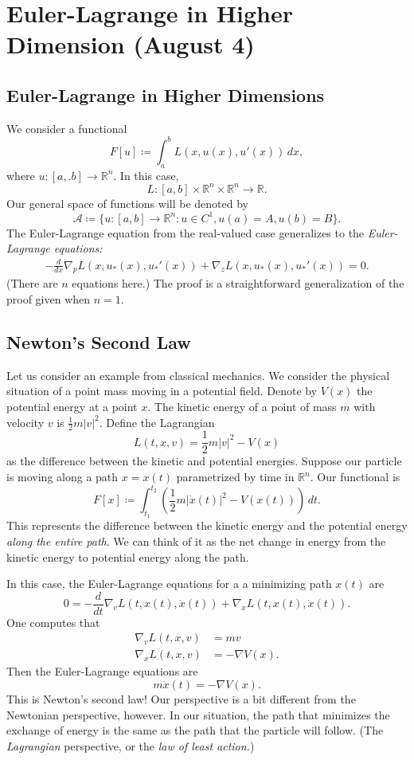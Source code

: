 \documentclass[11pt]{article}
\newcommand{\R}{\mathbb{R}}
\begin{document}
\section{Euler-Lagrange in Higher Dimension (August 4)}

\subsection{Euler-Lagrange in Higher Dimensions}

We consider a functional
\[
F[u] \coloneqq \int_a^b L(x, u(x), u'(x)) \, dx,
\]
where $u : [a,.b] \to \R^n$. In this case,
\[
L : [a, b] \times \R^n \times \R^n \to \R.
\]
Our general space of functions will be denoted by 
\[
\mathcal{A} \coloneqq \{ u : [a,b] \to \R^n : u \in C^1, u(a) = A, u(b) = B \}.
\]
The Euler-Lagrange equation from the real-valued case generalizes to the \emph{Euler-Lagrange equations:}
\begin{align*}
-\frac{d}{dx} \nabla_p L(x, u_*(x), u_*'(x)) + \nabla_z L(x, u_*(x), u_*'(x)) = 0.
\end{align*}
(There are $n$ equations here.) The proof is a straightforward generalization of the proof given when $n = 1$.

\subsection{Newton's Second Law}

Let us consider an example from classical mechanics. We consider the physical situation of a point mass moving in a potential field. Denote by $V(x)$ the potential energy at a point $x$. The kinetic energy of a point of mass $m$ with velocity $v$ is $\frac{1}{2} m |v|^2$. Define the Lagrangian
\[
L(t,x,v) = \frac{1}{2} m |v|^2 - V(x)
\]
as the difference between the kinetic and potential energies. Suppose our particle is moving along a path $x = x(t)$ parametrized by time in $\R^n$. Our functional is
\[
F[x] \coloneqq \int_{t_1}^{t_2} \left( \frac{1}{2} m |\dot{x}(t)|^2 - V(x(t)) \right) \, dt.
\]
This represents the difference between the kinetic energy and the potential energy \emph{along the entire path}. We can think of it as the net change in energy from the kinetic energy to potential energy along the path.

In this case, the Euler-Lagrange equations for a a minimizing path $x(t)$ are
\[
0 = -\frac{d}{dt} \nabla_v L(t, x(t), \dot{x}(t)) + \nabla_x L(t, x(t), \dot{x}(t)).
\]
One computes that 
\begin{align*}
\nabla_v L(t,x,v) &= mv \\
\nabla_x L(t,x,v) &= -\nabla V(x).
\end{align*}
Then the Euler-Lagrange equations are
\[
\boxed{m \ddot{x}(t) = -\nabla V(x).}
\]
This is Newton's second law! Our perspective is a bit different from the Newtonian perspective, however. In our situation, the path that minimizes the exchange of energy is the same as the path that the particle will follow. (The \emph{Lagrangian} perspective, or the \emph{law of least action.})
\end{document}
